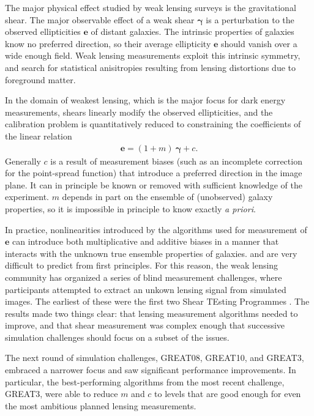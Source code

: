 \documentclass[iop]{emulateapj}
\begin{document}
The major physical effect studied by weak lensing surveys is the
 gravitational shear. The major observable effect of a weak shear
$\boldsymbol{\gamma}$ is a perturbation to the observed ellipticities
$\boldsymbol{e}$ of distant galaxies. The intrinsic properties of
galaxies know no preferred direction, so their average ellipticity
$\boldsymbol{e}$ should vanish over a wide enough field. Weak lensing
measurements exploit this intrinsic symmetry, and search for
statistical anisitropies resulting from lensing distortions due to
foreground matter.

In the domain of weakest lensing, which is the major focus for
dark energy measurements, shears linearly modify the observed
ellipticities, and the calibration problem is quantitatively reduced
to constraining the coefficients of the linear relation
\begin{align}
\boldsymbol{e} = (1+m)\:\boldsymbol{\gamma} + c.
\end{align}
Generally $c$ is a result of measurement biases (such as an incomplete
correction for the point-spread function) that introduce a preferred
direction in the image plane. It can in principle be known or removed
with sufficient knowledge of the experiment. $m$ depends in part on
the ensemble of (unobserved) galaxy properties, so it is impossible in
principle to know exactly {\it a priori}.

In practice, nonlinearities introduced by the algorithms used for
measurement of $\boldsymbol{e}$ can introduce both multiplicative and
additive biases in a manner that interacts with the unknown true
ensemble properties of galaxies. and are very difficult to predict
from first principles. For this reason, the weak lensing community has
organized a series of blind measurement challenges, where participants
attempted to extract an unkown lensing signal from simulated images.
The earliest of these were the first two Shear TEsting Programmes
\citep[STEP1,STEP2]{2006MNRAS.368.1323H,2007MNRAS.376...13M}. The
results made two things clear: that lensing measurement algorithms
needed to improve, and that shear measurement was complex enough that
successive simulation challenges should focus on a subset of the
issues.

The next round of simulation challenges, GREAT08, GREAT10, and GREAT3,
\citep{2009AnApS...3....6B,2013ApJS..205...12K,2015MNRAS.450.2963M}
embraced a narrower focus and saw significant performance
improvements. In particular, the best-performing algorithms from the
most recent challenge, GREAT3, were able to reduce $m$ and $c$ to
levels that are good enough for even the most ambitious planned
lensing measurements.
\end{document}
